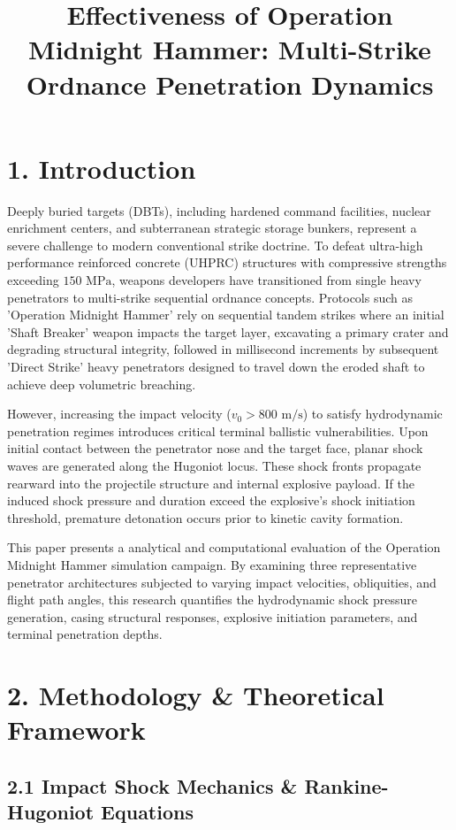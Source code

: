 \documentclass[journal,10pt,twocolumn]{IEEEtran}
\begin{document}
\title{Effectiveness of Operation Midnight Hammer: Multi-Strike Ordnance Penetration Dynamics}

\section{1. Introduction}

Deeply buried targets (DBTs), including hardened command facilities, nuclear enrichment centers, and subterranean strategic storage bunkers, represent a severe challenge to modern conventional strike doctrine. To defeat ultra-high performance reinforced concrete (UHPRC) structures with compressive strengths exceeding $150\text{ MPa}$, weapons developers have transitioned from single heavy penetrators to multi-strike sequential ordnance concepts. Protocols such as 'Operation Midnight Hammer' rely on sequential tandem strikes where an initial 'Shaft Breaker' weapon impacts the target layer, excavating a primary crater and degrading structural integrity, followed in millisecond increments by subsequent 'Direct Strike' heavy penetrators designed to travel down the eroded shaft to achieve deep volumetric breaching.

However, increasing the impact velocity ($v_0 > 800\text{ m/s}$) to satisfy hydrodynamic penetration regimes introduces critical terminal ballistic vulnerabilities. Upon initial contact between the penetrator nose and the target face, planar shock waves are generated along the Hugoniot locus. These shock fronts propagate rearward into the projectile structure and internal explosive payload. If the induced shock pressure and duration exceed the explosive's shock initiation threshold, premature detonation occurs prior to kinetic cavity formation.

This paper presents a analytical and computational evaluation of the Operation Midnight Hammer simulation campaign. By examining three representative penetrator architectures subjected to varying impact velocities, obliquities, and flight path angles, this research quantifies the hydrodynamic shock pressure generation, casing structural responses, explosive initiation parameters, and terminal penetration depths.



\section{2. Methodology & Theoretical Framework}

\subsection{2.1 Impact Shock Mechanics & Rankine-Hugoniot Equations}
\end{document}
